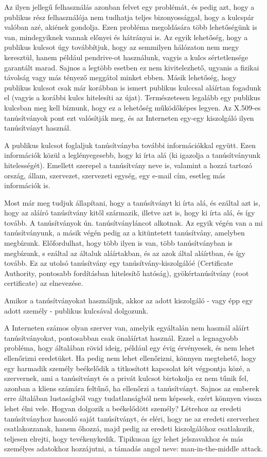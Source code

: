 Az ilyen jellegű felhasználás azonban felvet egy problémát, és pedig azt, hogy a publikus rész felhasználója nem
tudhatja teljes bizonyossággal, hogy a kulcspár valóban azé, akiének gondolja. Ezen probléma megoldására több
lehetőségünk is van, mindegyiknek vannak előnyei és hátrányai is. Az egyik lehetőség, hogy a publikus kulcsot úgy
továbbítjuk, hogy az semmilyen hálózaton nem megy keresztül, hanem például pendrive-ot használunk, vagyis a kulcs
sértetlensége garantált marad. Sajnos a legtöbb esetben ez nem kivitelezhető, ugyanis a fizikai távolság vagy más
tényező meggátol minket ebben. Másik lehetőség, hogy publikus kulcsot  csak már korábban is ismert publikus kulccsal
aláírtan fogadunk el (vagyis a korábbi kulcs hitelesíti az újat). Természetesen legalább egy publikus kulcsban meg kell
bíznunk, hogy ez a lehetőség működőképes legyen. Az X.509-es tanúsítványok pont ezt valósítják meg, és az Interneten
egy-egy kiszolgáló ilyen tanúsítványt használ.


A publikus kulcsot foglaljuk tanúsítványba további információkkal együtt. Ezen információk közül a leglényegesebb, hogy
ki írta alá (ki igazolja a tanúsítványunk hitelességét). Emellett szerepel a tanúsítvány neve is, valamint a hozzá
tartozó ország, állam, szervezet, szervezeti egység, egy e-mail cím, esetleg más információk is.

Most már meg tudjuk állapítani, hogy a tanúsítványt ki írta alá, és ezáltal azt is, hogy az aláíró tanúsítvány kitől
származik, illetve azt is, hogy ki írta alá, és így tovább. A tanúsítványok ún. tanúsítványláncot alkotnak. Az egyik
végén van a mi tanúsítványunk, a másik végén pedig az a kitüntetett tanúsítvány, amelyben megbízunk. Előfordulhat, hogy
több ilyen is van, több tanúsítványban is megbízunk, s ezáltal az általuk aláírtakban, és az azok által aláírtban, és
így tovább. Ez az utolsó tanúsítvány egy tanúsítvány-kiszolgálóé (Certificate Authority, pontosabb fordításban hitelesítő
hatóság), gyökértanúsítvány (root certificate) az elnevezése.

Amikor a tanúsítványokat használjuk, akkor az adott kiszolgáló - vagy épp egy adott személy - publikus kulcsával
dolgozunk.

A Interneten számos olyan szerver van, amelyik egyáltalán nem használ aláírt tanúsítványokat, pontosabban csak
önaláírtat használ. Ezzel a legnagyobb probléma, hogy általában rövid ideig, például egy évig érvényesek, és nem lehet
ellenőrizni eredetüket. Ha pedig nem lehet ellenőrizni, könnyen megtehető, hogy egy harmadik személy beékelődik a
titkosított kapcsolat két végpontja közé, a szervernek, ami a tanúsítványt és a privát kulcsot birtokolja ez nem tűnik
fel, azonban a kliens számára feltűnő, ha ellenőrzi a tanúsítványt. Sajnos az emberek erre általában lustaságból vagy
tudatlanságból nem képesek, ezért könnyen vissza lehet élni vele. Hogyan dolgozik a beékelődött személy? Létrehoz az
eredeti tanúsítványhoz hasonló saját tanúsítványt, és eléri, hogy ne az eredeti szerverhez csatlakozzanak, hanem őhozzá,
majd pedig az eredeti kiszolgálóhoz csatlakozik, teljesen elrejti, hogy tevékenykedik. Tipikusan így lehet jelszavakhoz
és más személyes adatokhoz hozzájutni, a támadás angol neve: man-in-the-middle attack.

